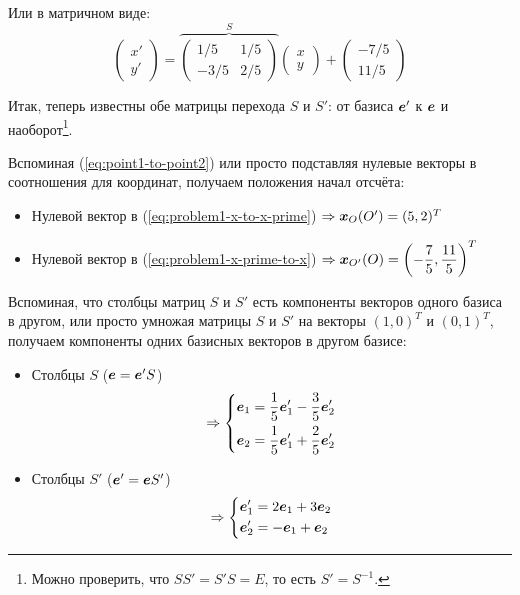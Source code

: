 \documentclass[a4paper,12pt]{article}
\begin{document}
\begin{solution}
    Или в матричном виде:
    \begin{equation}\label{eq:problem1-x-prime-to-x}
      \begin{pmatrix}
        x'\\
        y'
      \end{pmatrix}
      = \overbrace{\begin{pmatrix}
        1/5 & 1/5\\
        -3/5 & 2/5
      \end{pmatrix}}^{S}
      \begin{pmatrix}
        x\\
        y
      \end{pmatrix}
      + \begin{pmatrix}
        -7/5\\
        11/5
      \end{pmatrix}
    \end{equation}
    
    Итак, теперь известны обе матрицы перехода $S$ и $S'$: от базиса $\boldsymbol e'$ к $\boldsymbol e$ и наоборот\footnote{Можно проверить, что $SS' = S'S = E$, то есть $S' = S^{-1}$.}.
    
    Вспоминая (\ref{eq:point1-to-point2}) или просто подставляя нулевые векторы в соотношения для координат, получаем положения начал отсчёта:
    \begin{itemize}
      \item Нулевой вектор в (\ref{eq:problem1-x-to-x-prime}) $\Rightarrow \boldsymbol x_O(O') = (5, 2)^T$
      \item Нулевой вектор в (\ref{eq:problem1-x-prime-to-x}) $\Rightarrow \boldsymbol x_{O'}(O) = \left(-\dfrac{7}{5}, \dfrac{11}{5}\right)^T$
    \end{itemize}
    
    Вспоминая, что столбцы матриц $S$ и $S'$ есть компоненты векторов одного базиса в другом, или просто умножая матрицы $S$ и $S'$ на векторы $(1, 0)^T$ и $(0, 1)^T$, получаем компоненты одних базисных векторов в другом базисе:
    \begin{itemize}
      \item Столбцы $S$ ($\bds e \hm= \bds e' S$)
        \[
          \Rightarrow \left\{
            \begin{aligned}
              &\boldsymbol e_1 = \frac{1}{5} \boldsymbol e_1' - \frac{3}{5} \boldsymbol e_2'\\
              &\boldsymbol e_2 = \frac{1}{5} \boldsymbol e_1' + \frac{2}{5} \boldsymbol e_2'
            \end{aligned}
          \right.
        \]
      \item Столбцы $S'$ ($\bds e' \hm= \bds e S'$)
        \[
          \Rightarrow \left\{
            \begin{aligned}
              &\boldsymbol e_1' = 2 \boldsymbol e_1 + 3 \boldsymbol e_2\\
              &\boldsymbol e_2' = -\boldsymbol e_1 + \boldsymbol e_2
            \end{aligned}
          \right.
        \]
    \end{itemize}
  \end{solution}
  
\end{document}
